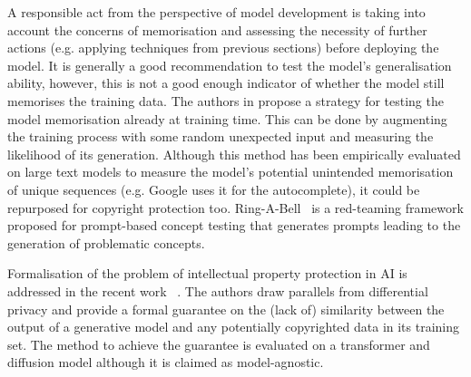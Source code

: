 \documentclass[conference]{IEEEtran}
\begin{document}
A responsible act from the perspective of model development is taking into account the concerns of memorisation and assessing the necessity of further actions (e.g. applying techniques from previous sections) before deploying the model.
It is generally a good recommendation to test the model's generalisation ability, however, this is not a good enough indicator of whether the model still memorises the training data. 
The authors in \cite{carlini_secret_2019} propose a strategy for testing the model memorisation already at training time. This can be done by augmenting the training process with some random unexpected input and measuring the likelihood of its generation. Although this method has been empirically evaluated on large text models to measure the model's potential unintended memorisation of unique sequences (e.g. Google uses it for the autocomplete), it could be repurposed for copyright protection too. 
Ring-A-Bell~\cite{tsai_ring--bell_2023} is a red-teaming framework proposed for prompt-based concept testing that generates prompts leading to the generation of problematic concepts.

Formalisation of the problem of intellectual property protection in AI is addressed in the recent work ~\cite{vyas_provable_2023}. 
The authors draw parallels from differential privacy and provide a formal guarantee on the (lack of) similarity between the output of a generative model and any potentially copyrighted data in its training set. 
The method to achieve the guarantee is evaluated on a transformer and diffusion model although it is claimed as model-agnostic.


\end{document}
